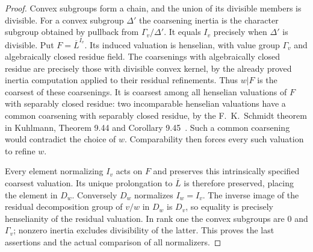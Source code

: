 \documentclass[11pt,oneside]{article}
\begin{document}
\begin{proof}
Convex subgroups form a chain, and the union of its divisible
members is divisible. For a convex subgroup $\Delta'$ the
coarsening inertia is the character subgroup obtained by pullback
from $\Gamma_v/\Delta'$. It equals $I_v$ precisely when
$\Delta'$ is divisible. Put $F=\overline L^{I_v}$. Its induced
valuation is henselian, with value group $\Gamma_v$ and
algebraically closed residue field. The coarsenings with
algebraically closed residue are precisely those with divisible
convex kernel, by the already proved inertia computation applied
to their residual refinements. Thus $w|F$ is the coarsest of
these coarsenings. It is coarsest among all henselian valuations
of $F$ with separably closed residue: two incomparable henselian
valuations have a common coarsening with separably closed
residue, by the F.~K.~Schmidt theorem in Kuhlmann, Theorem 9.44
and Corollary 9.45~\cite{F-KuhlmannHensel}. Such a common
coarsening would contradict the choice of $w$. Comparability
then forces every such valuation to refine $w$.

Every element normalizing $I_v$ acts on $F$ and preserves this
intrinsically specified coarsest valuation. Its unique
prolongation to $\overline L$ is therefore preserved, placing
the element in $D_w$. Conversely $D_w$ normalizes $I_w=I_v$.
The inverse image of the residual decomposition group of $v/w$
in $D_w$ is $D_v$, so equality is precisely henselianity of the
residual valuation. In rank one the convex subgroups are $0$
and $\Gamma_v$; nonzero inertia excludes divisibility of the
latter. This proves the last assertions and the actual comparison
of all normalizers.
\end{proof}
\end{document}
